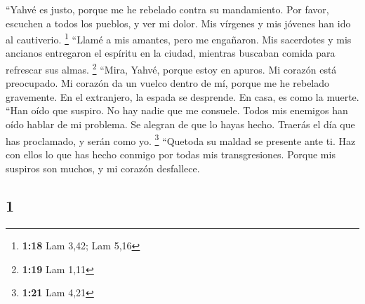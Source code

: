 \begin{paracol}{2}
 ``Yahvé es justo, porque me he rebelado contra su
mandamiento. Por favor, escuchen a todos los pueblos, y ver mi dolor.
Mis vírgenes y mis jóvenes han ido al cautiverio. \footnote{\textbf{1:18}
  Lam 3,42; Lam 5,16}  ``Llamé a mis amantes, pero me
engañaron. Mis sacerdotes y mis ancianos entregaron el espíritu en la
ciudad, mientras buscaban comida para refrescar sus almas. \footnote{\textbf{1:19}
  Lam 1,11}  ``Mira, Yahvé, porque estoy en apuros. Mi
corazón está preocupado. Mi corazón da un vuelco dentro de mí, porque me
he rebelado gravemente. En el extranjero, la espada se desprende. En
casa, es como la muerte.  ``Han oído que suspiro. No hay
nadie que me consuele. Todos mis enemigos han oído hablar de mi
problema. Se alegran de que lo hayas hecho. Traerás el día que has
proclamado, y serán como yo. \footnote{\textbf{1:21} Lam 4,21}
 ``Quetoda su maldad se presente ante ti. Haz con ellos
lo que has hecho conmigo por todas mis transgresiones. Porque mis
suspiros son muchos, y mi corazón desfallece.

\switchcolumn
\begin{otherlanguage}{english}

\hypertarget{section-1}{%
\section{1}\label{section-1}}


\end{otherlanguage}
\end{paracol}
